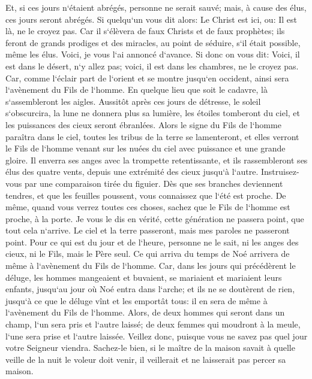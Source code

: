 \verse Et, si ces jours n`étaient abrégés, personne ne serait sauvé; mais, à cause des élus, ces jours seront abrégés. 
\verse Si quelqu`un vous dit alors: Le Christ est ici, ou: Il est là, ne le croyez pas. 
\verse Car il s`élèvera de faux Christs et de faux prophètes; ils feront de grands prodiges et des miracles, au point de séduire, s`il était possible, même les élus. 
\verse Voici, je vous l`ai annoncé d`avance. 
\verse Si donc on vous dit: Voici, il est dans le désert, n`y allez pas; voici, il est dans les chambres, ne le croyez pas. 
\verse Car, comme l`éclair part de l`orient et se montre jusqu`en occident, ainsi sera l`avènement du Fils de l`homme. 
\verse En quelque lieu que soit le cadavre, là s`assembleront les aigles. 
\verse Aussitôt après ces jours de détresse, le soleil s`obscurcira, la lune ne donnera plus sa lumière, les étoiles tomberont du ciel, et les puissances des cieux seront ébranlées. 
\verse Alors le signe du Fils de l`homme paraîtra dans le ciel, toutes les tribus de la terre se lamenteront, et elles verront le Fils de l`homme venant sur les nuées du ciel avec puissance et une grande gloire. 
\verse Il enverra ses anges avec la trompette retentissante, et ils rassembleront ses élus des quatre vents, depuis une extrémité des cieux jusqu`à l`autre. 
\verse Instruisez-vous par une comparaison tirée du figuier. Dès que ses branches deviennent tendres, et que les feuilles poussent, vous connaissez que l`été est proche. 
\verse De même, quand vous verrez toutes ces choses, sachez que le Fils de l`homme est proche, à la porte. 
\verse Je vous le dis en vérité, cette génération ne passera point, que tout cela n`arrive. 
\verse Le ciel et la terre passeront, mais mes paroles ne passeront point. 
\verse Pour ce qui est du jour et de l`heure, personne ne le sait, ni les anges des cieux, ni le Fils, mais le Père seul. 
\verse Ce qui arriva du temps de Noé arrivera de même à l`avènement du Fils de l`homme. 
\verse Car, dans les jours qui précédèrent le déluge, les hommes mangeaient et buvaient, se mariaient et mariaient leurs enfants, jusqu`au jour où Noé entra dans l`arche; 
\verse et ils ne se doutèrent de rien, jusqu`à ce que le déluge vînt et les emportât tous: il en sera de même à l`avènement du Fils de l`homme. 
\verse Alors, de deux hommes qui seront dans un champ, l`un sera pris et l`autre laissé; 
\verse de deux femmes qui moudront à la meule, l`une sera prise et l`autre laissée. 
\verse Veillez donc, puisque vous ne savez pas quel jour votre Seigneur viendra. 
\verse Sachez-le bien, si le maître de la maison savait à quelle veille de la nuit le voleur doit venir, il veillerait et ne laisserait pas percer sa maison. 

